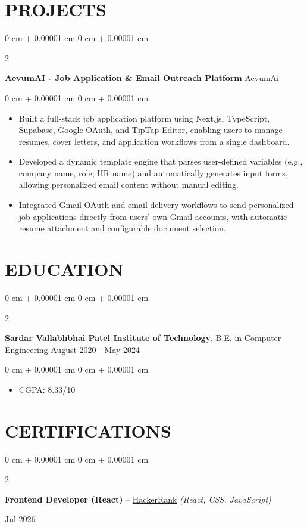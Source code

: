 \documentclass[10pt, letterpaper]{article}
\newenvironment{highlights}{
    \begin{itemize}[
        topsep=0.10 cm,
        parsep=0.10 cm,
        partopsep=0pt,
        itemsep=0pt,
        leftmargin=0 cm + 10pt
    ]
}{
    \end{itemize}
} %
\newenvironment{onecolentry}{
    \begin{adjustwidth}{
        0 cm + 0.00001 cm
    }{
        0 cm + 0.00001 cm
    }
}{
    \end{adjustwidth}
} %
\newenvironment{twocolentry}[2][]{
    \onecolentry
    \def\secondColumn{#2}
    \setcolumnwidth{\fill, 4.5 cm}
    \begin{paracol}{2}
}{
    \switchcolumn \raggedleft \secondColumn
    \end{paracol}
    \endonecolentry
} %
\begin{document}
\section{PROJECTS}
\begin{twocolentry}{
        \href{https://aevum-ai.goswamikaushik.dev/}{AevumAi}
    }
    \textbf{AevumAI - Job Application \& Email Outreach Platform}\end{twocolentry}

\vspace{0.10 cm}
\begin{onecolentry}
    \begin{highlights}
        \item Built a full-stack job application platform using Next.js, TypeScript, Supabase, Google OAuth, and TipTap Editor, enabling users to manage resumes, cover letters, and application workflows from a single dashboard.
        \item Developed a dynamic template engine that parses user-defined variables (e.g., company name, role, HR name) and automatically generates input forms, allowing personalized email content without manual editing.
        \item Integrated Gmail OAuth and email delivery workflows to send personalized job applications directly from users' own Gmail accounts, with automatic resume attachment and configurable document selection.
    \end{highlights}
\end{onecolentry}

\section{EDUCATION}
\begin{twocolentry}{
        August 2020 - May 2024
    }
    \textbf{Sardar Vallabhbhai Patel Institute of Technology}, B.E. in Computer Engineering\end{twocolentry}

\vspace{0.10 cm}
\begin{onecolentry}
    \begin{highlights}
        \item CGPA: 8.33/10
    \end{highlights}
\end{onecolentry}

\section{CERTIFICATIONS}
\begin{twocolentry}{Jul 2026}
    \textbf{Frontend Developer (React)} -- \href{https://www.hackerrank.com/certificates/ef3bc79336cb}{HackerRank} \textit{(React, CSS, JavaScript)}
\end{twocolentry}
\end{document}
